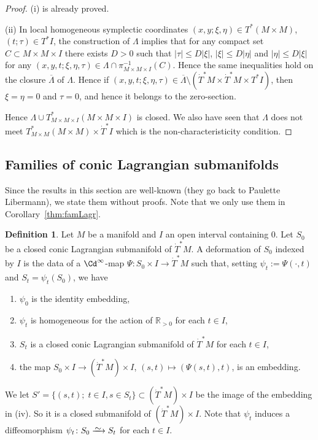 \documentclass[12pt,leqno]{article}
\theoremstyle{definition}
\newtheorem{definition}[theorem]{Definition}
\newcommand{\R}{{\mathbb{R}}}
\renewcommand{\to}[1][]{\xrightarrow[]{#1}}
\newcommand{\isoto}[1][]{\xrightarrow[#1]%
{{\raisebox{-.6ex}[0ex][-.6ex]{$\mspace{1mu}\sim\mspace{2mu}$}}}}
\newcommand{\opb}[1]{#1^{-1}}
\newcommand{\eqdot}{\mathbin{:=}}
\newcommand{\cl}{\colon}
\newcommand{\ol}{\overline}
\newcommand{\bnum}{\begin{enumerate}[{\rm(i)}]}
\newcommand{\enum}{\end{enumerate}}
\newcommand{\dT}{{\dot{T}}}
\newcommand{\dTM}{{\dT}^*M}
\numberwithin{equation}{section}
\begin{document}
\begin{proof}
(i)  is already proved. 

\medskip\noindent
(ii) In local homogeneous symplectic coordinates 
$(x,y;\xi,\eta)\in T^*(M\times M)$, 
$(t;\tau)\in T^*I$, the construction of $\Lambda$
implies that
for any compact set $C\subset M\times M \times I$
there exists $D>0$ such that $|\tau|\leq D\vert\xi\vert$,
$\vert\xi\vert\leq D\vert\eta\vert$ and $\vert\eta\vert\leq D\vert\xi\vert$
for any
$(x,y,t;\xi,\eta,\tau)\in \Lambda \cap \opb{\pi_{M\times M \times I}}(C)$.
Hence the same inequalities hold on the closure $\ol{\Lambda}$ of $\Lambda$.
Hence if $(x,y,t;\xi,\eta,\tau)\in\ol{\Lambda}\setminus
(\dTM\times\dTM\times T^*I)$, then
$\xi=\eta=0$ and $\tau=0$, and hence it belongs to the zero-section.  

Hence $\Lambda\cup T^*_{M\times M\times I}(M\times M\times I)$ is closed.
We also have seen that $\Lambda$ does not meet
$T^*_{M\times M}(M\times M) \times \dT^*I$ which is the
non-characteristicity condition.
\end{proof}

\subsection{Families of conic Lagrangian submanifolds}
Since the results in this section are well-known (they go back to
Paulette Libermann), we state them without proofs.
Note that we only use them in Corollary~\ref{thm:famLagr}.

\begin{definition}\label{def:family-Lagr}
Let $M$ be a manifold and $I$ an open interval containing $0$. 
Let $S_0$ be a closed conic Lagrangian submanifold of $\dTM$.
A deformation of $S_0$ indexed by $I$ is the data of a $\Cd^\infty$-map
$\Psi\cl S_0\times I \to \dTM$ such that, setting
$\psi_t \eqdot \Psi(\cdot,t)$ and $S_t=\psi_t(S_0)$, we have
\bnum
\item $\psi_0$ is the identity embedding,
\item $\psi_t$ is homogeneous for the action of $\R_{>0}$ for each $t\in I$,
\item $S_t$ is a closed conic Lagrangian submanifold of $\dTM$
for each $t\in I$,
\item the map $S_0\times I \to (\dTM) \times I$, $(s,t) \mapsto (\Psi(s,t),t)$,
is an embedding.
\enum
\end{definition}
 We let
$S' = \{ (s,t); \; t\in I, s \in S_t    \} \subset (\dTM)\times I$
be the image of the embedding in (iv). So it is a closed submanifold of
$(\dTM)\times I$.
Note that $\psi_t$ induces a diffeomorphism $\psi_t \cl S_0 \isoto S_t$ for each
$t\in I$.
\end{document}

